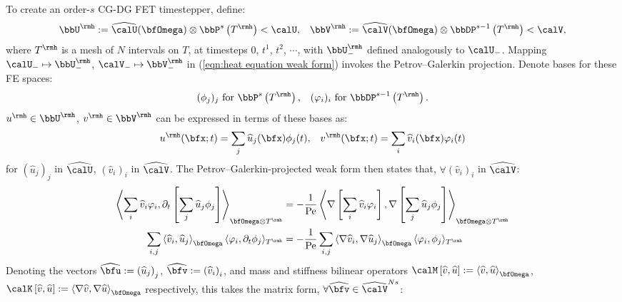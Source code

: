 \begin{example}
        To create an order-$s$ CG-DG FET timestepper, define:
        \begin{align}
            \bbU^{\rmh}  :=  \widehat{\calU}(\bfOmega)\otimes\bbP^{s}\left(T^{\rmh}\right)  <  \calU,  &&
            \bbV^{\rmh}  :=  \widehat{\calV}(\bfOmega)\otimes\bbDP^{s - 1}\left(T^{\rmh}\right)  <  \calV,
        \end{align}
        where $T^{\rmh}$ is a mesh of $N$ intervals on $T$, at timesteps $0$, $t^{1}$, $t^{2}$, $\cdots$, with $\bbU^{\rmh}_{-}$ defined analogously to $\calU_{-}$. Mapping $\calU_{-}  \mapsto  \bbU^{\rmh}_{-}$, $\calV_{-}  \mapsto  \bbV^{\rmh}_{-}$ in (\ref{eqn:heat equation weak form}) invokes the Petrov–Galerkin projection. Denote bases for these FE spaces:
        \begin{align}
            (\phi_{j})_{j}     \text{ for }  \bbP^{s}\left(T^{\rmh}\right),         &&
            (\varphi_{i})_{i}  \text{ for }  \bbDP^{s - 1}\left(T^{\rmh}\right).
        \end{align}
        $u^{\rmh}  \in  \bbU^{\rmh}$, $v^{\rmh}  \in  \bbV^{\rmh}$ can be expressed in terms of these bases as:
        \begin{align}
            u^{\rmh}(\bfx; t)  =  \sum_{j}\widehat{u}_{j}(\bfx)\phi_{j}(t),  &&
            v^{\rmh}(\bfx; t)  =  \sum_{i}\widehat{v}_{i}(\bfx)\varphi_{i}(t)
        \end{align}
        for $\left(\widehat{u}_{j}\right)_{j}$ in $\widehat{\calU}$, $\left(\widehat{v}_{i}\right)_{i}$ in $\widehat{\calV}$. The Petrov–Galerkin-projected weak form then states that, $\forall  \left(\widehat{v}_{i}\right)_{i}$ in $\widehat{\calV}$:
        \begin{align}
            \left\langle\sum_{i}\widehat{v}_{i}\varphi_{i}, \partial_{t}\left[\sum_{j}\widehat{u}_{j}\phi_{j}\right]\right\rangle_{\bfOmega\otimes T^{\rmh}}  &=  - \frac{1}{\rmPe}\left\langle\nabla\left[\sum_{i}\widehat{v}_{i}\varphi_{i}\right], \nabla\left[\sum_{j}\widehat{u}_{j}\phi_{j}\right]\right\rangle_{\bfOmega\otimes T^{\rmh}}  \\
            \sum_{i, j}\left\langle\widehat{v}_{i}, \widehat{u}_{j}\right\rangle_{\bfOmega}\langle\varphi_{i}, \partial_{t}\phi_{j}\rangle_{T^{\rmh}}  &=  - \frac{1}{\rmPe}\sum_{i, j}\left\langle\nabla\widehat{v}_{i}, \nabla\widehat{u}_{j}\right\rangle_{\bfOmega}\langle\varphi_{i}, \phi_{j}\rangle_{T^{\rmh}}
        \end{align}
        Denoting the vectors $\widehat{\bfu}  :=  \left(\widehat{u}_{j}\right)_{j}$, $\widehat{\bfv}  :=  \left(\widehat{v}_{i}\right)_{i}$, and mass and stiffness bilinear operators $\calM\left[\widehat{v}, \widehat{u}\right]  :=  \left\langle\widehat{v}, \widehat{u}\right\rangle_{\bfOmega}$, $\calK\left[\widehat{v}, \widehat{u}\right]  :=  \left\langle\nabla\widehat{v}, \nabla\widehat{u}\right\rangle_{\bfOmega}$ respectively, this takes the matrix form, $\forall  \widehat{\bfv}  \in  \widehat{\calV}^{Ns}$:

\end{example}
